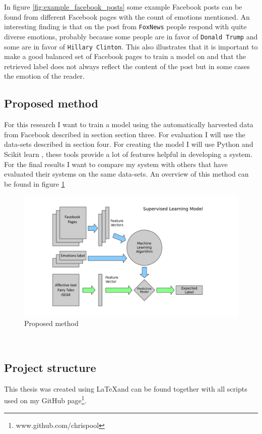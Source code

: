 \documentclass[11pt]{article}
\begin{document}
In figure \ref{fig:example_facebook_posts} some example Facebook posts can be found from different Facebook pages with the count of emotions mentioned. An interesting finding is that on the post from \texttt{FoxNews} people respond with quite diverse emotions, probably because some people are in favor of \texttt{Donald Trump} and some are in favor of \texttt{Hillary Clinton}. This also illustrates that it is important to make a good balanced set of Facebook pages to train a model on and that the retrieved label does not always reflect the content of the post but in some cases the emotion of the reader.

\subsection{Proposed method}
For this research I want to train a model using the automatically harvested data from Facebook described in section section three. For evaluation I will use the data-sets described in section four. For creating the model I will use Python and Scikit learn \cite{scikit-learn}, these tools provide a lot of features helpful in developing a system. For the final results I want to compare my system with others that have evaluated their systems on the same data-sets. An overview of this method can be found in figure \ref{fig:proposed_method}
\begin{figure}[ht]
  \includegraphics[width=\linewidth]{supervised_learning.png}
  \caption{Proposed method \cite{astroMLText}}
  \label{fig:proposed_method}
\end{figure}\\

\subsection{Project structure}
This thesis was created using \LaTeX  and can be found together with all scripts used on my GitHub page\footnote{www.github.com/chrispool}.
\end{document}
